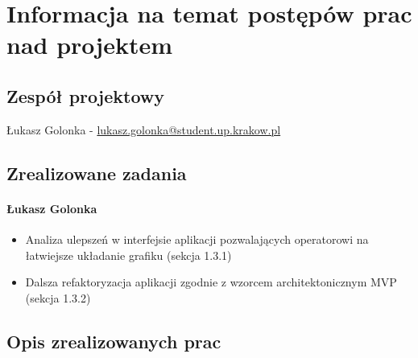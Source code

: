 \documentclass[12pt,a4paper,oneside]{article}
\theoremstyle{definition}
\numberwithin{equation}{section}
\begin{document}
\tableofcontents


\newpage

\section{Informacja na temat postępów prac nad projektem}
\subsection{Zespół projektowy}
Łukasz Golonka - \href{mailto:lukasz.golonka@student.up.krakow.pl}{lukasz.golonka@student.up.krakow.pl}
\subsection{Zrealizowane zadania}
\paragraph{Łukasz Golonka}
\begin{itemize}
	\item Analiza ulepszeń w interfejsie aplikacji pozwalających operatorowi na łatwiejsze układanie grafiku (sekcja 1.3.1)
	\item Dalsza refaktoryzacja aplikacji zgodnie z wzorcem architektonicznym MVP (sekcja 1.3.2)
\end{itemize}

\subsection {Opis zrealizowanych prac}
\end{document}
